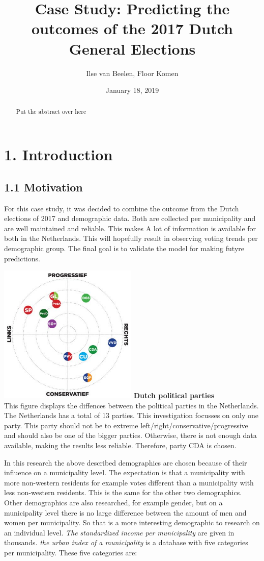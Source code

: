 \documentclass[11pt,]{article}
\title{Case Study: Predicting the outcomes of the 2017 Dutch General Elections}
\author{Ilse van Beelen, Floor Komen}
\date{January 18, 2019}
\begin{document}
\maketitle
\begin{abstract}
Put the abstract over here
\end{abstract}

\section{1. Introduction}\label{introduction}

\subsection{1.1 Motivation}\label{motivation}

For this case study, it was decided to combine the outcome from the
Dutch elections of 2017 and demographic data. Both are collected per
municipality and are well maintained and reliable. This makes A lot of
information is available for both in the Netherlands. This will
hopefully result in observing voting trends per demographic group. The
final goal is to validate the model for making futyre predictions.

\includegraphics[width=2.60417in]{Partijlandschap.jpg} \textbf{Dutch
political parties}\\
This figure displays the diffences between the political parties in the
Netherlands. The Netherlands has a total of 13 parties. This
investigation focusses on only one party. This party should not be to
extreme left/right/conservative/progressive and should also be one of
the bigger parties. Otherwise, there is not enough data available,
making the results less reliable. Therefore, party CDA is chosen.

In this research the above described demographics are chosen because of
their influence on a municipality level. The expectation is that a
municipality with more non-western residents for example votes different
than a municipality with less non-western residents. This is the same
for the other two demographics. Other demographics are also researched,
for example gender, but on a municipality level there is no large
difference between the amount of men and women per municipality. So that
is a more interesting demographic to research on an individual level.
\emph{The standardized income per municipality} are given in thousands.
\emph{the urban index of a municipality} is a database with five
categories per municipality. These five categories are:
\end{document}
